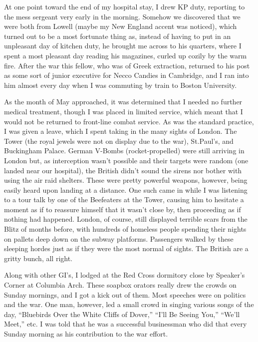 \documentclass[../m3y]{subfiles}
\begin{document}
At one point toward the end of my hospital stay, I drew KP duty, reporting to the mess sergeant very early in the morning. Somehow we discovered that we were both from Lowell (maybe my New England accent was noticed), which turned out to be a most fortunate thing as, instead of having to put in an unpleasant day of kitchen duty, he brought me across to his quarters, where I spent a most pleasant day reading his magazines, curled up cozily by the warm fire. After the war this fellow, who was of Greek extraction, returned to his post as some sort of junior executive for Necco Candies in Cambridge, and I ran into him almost every day when I was commuting by train to Boston University.

As the month of May approached, it was determined that I needed no further medical treatment, though I was placed in limited service, which meant that I would not be returned to front-line combat service. As was the standard practice, I was given a leave, which I spent taking in the many sights of London. The Tower (the royal jewels were not on display due to the war), St.\@ Paul's, and Buckingham Palace. German V-Bombs (rocket-propelled) were still arriving in London but, as interception wasn't possible and their targets were random (one landed near our hospital), the British didn't sound the sirens nor bother with using the air raid shelters. These were pretty powerful weapons, however, being easily heard upon landing at a distance. One such came in while I was listening to a tour talk by one of the Beefeaters at the Tower, causing him to hesitate a moment as if to reassure himself that it wasn't close by, then proceeding as if nothing had happened. London, of course, still displayed terrible scars from the Blitz of months before, with hundreds of homeless people spending their nights on pallets deep down on the subway platforms. Passengers walked by these sleeping hordes just as if they were the most normal of sights. The British are a gritty bunch, all right.

Along with other GI's, I lodged at the Red Cross dormitory close by Speaker's Corner at Columbia Arch. These soapbox orators really drew the crowds on Sunday mornings, and I got a kick out of them. Most speeches were on politics and the war. One man, however, led a small crowd in singing various songs of the day, ``Bluebirds Over the White Cliffs of Dover,'' ``I'll Be Seeing You,'' ``We'll Meet,'' etc\@. I was told that he was a successful businessman who did that every Sunday morning as his contribution to the war effort.
\end{document}
